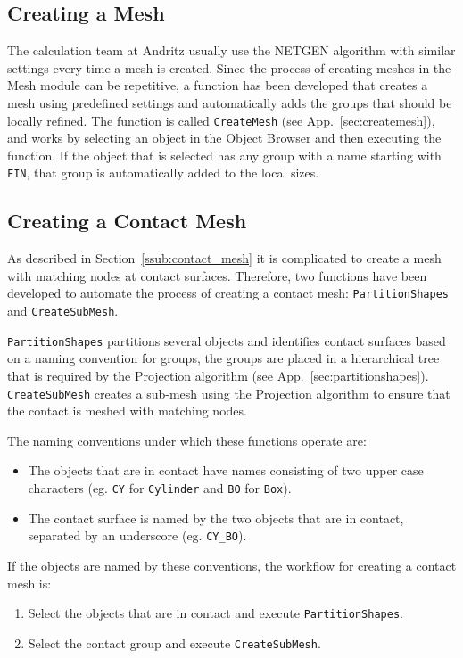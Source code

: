 
\subsection{Creating a Mesh} %
\label{sub:creating_a_mesh}
The calculation team at Andritz usually use the NETGEN algorithm with similar settings every time a mesh is created. Since the process of creating meshes in the Mesh module can be repetitive, a function has been developed that creates a mesh using predefined settings and automatically adds the groups that should be locally refined. The function is called \texttt{CreateMesh} (see App.~\ref{sec:createmesh}), and works by selecting an object in the Object Browser and then executing the function. If the object that is selected has any group with a name starting with \texttt{FIN}, that group is automatically added to the local sizes.

\subsection{Creating a Contact Mesh} %
\label{sub:creating_a_contact_mesh}
As described in Section~\ref{ssub:contact_mesh} it is complicated to create a mesh with matching nodes at contact surfaces. Therefore, two functions have been developed to automate the process of creating a contact mesh: \texttt{PartitionShapes} and \texttt{CreateSubMesh}.

\texttt{PartitionShapes} partitions several objects and identifies contact surfaces based on a naming convention for groups, the groups are placed in a hierarchical tree that is required by the Projection algorithm (see App.~\ref{sec:partitionshapes}). \texttt{CreateSubMesh} creates a sub-mesh using the Projection algorithm to ensure that the contact is meshed with matching nodes.

The naming conventions under which these functions operate are:
\begin{itemize}
	\item The objects that are in contact have names consisting of two upper case characters (eg. \texttt{CY} for \texttt{Cylinder} and \texttt{BO} for \texttt{Box}).
	\item The contact surface is named by the two objects that are in contact, separated by an underscore (eg. \texttt{CY\_BO}).
\end{itemize}
If the objects are named by these conventions, the workflow for creating a contact mesh is:
\begin{enumerate}
	\item Select the objects that are in contact and execute \texttt{PartitionShapes}.
	\item Select the contact group and execute \texttt{CreateSubMesh}.
\end{enumerate}

